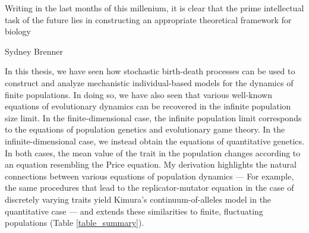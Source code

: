 \epigraph{\justifying Writing in the last months of this millenium, it is clear that the prime intellectual task of the future lies in constructing an appropriate theoretical framework for biology}{Sydney Brenner~\citep{brenner_theoretical_1999}}

\justifying
In this thesis, we have seen how stochastic birth-death processes can be used to construct and analyze mechanistic individual-based models for the dynamics of finite populations. In doing so, we have also seen that various well-known equations of evolutionary dynamics can be recovered in the infinite population size limit. In the finite-dimensional case, the infinite population limit corresponds to the equations of population genetics and evolutionary game theory. In the infinite-dimensional case, we instead obtain the equations of quantitative genetics. In both cases, the mean value of the trait in the population changes according to an equation resembling the Price equation. My derivation highlights the natural connections between various equations of population dynamics --- For example, the same procedures that lead to the replicator-mutator equation in the case of discretely varying traits yield Kimura's continuum-of-alleles model in the quantitative case --- and extends these similarities to finite, fluctuating populations (Table \ref{table_summary}).

